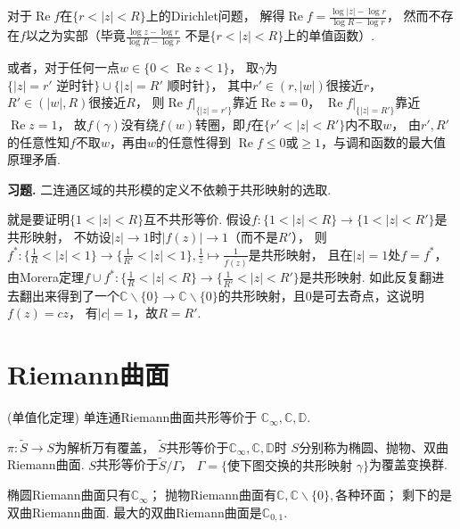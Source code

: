 \begin{proofc}
    对于$\operatorname{Re}f$在$\{r<|z|<R\}$上的Dirichlet问题，
    解得$\operatorname{Re}f=\frac{\log|z|-\log r}{\log R-\log r}$，
    然而不存在$f$以之为实部（毕竟$\frac{\log z-\log r}{\log R-\log r}$
    不是$\{r<|z|<R\}$上的单值函数）.

    或者，对于任何一点$w\in\{0<\operatorname{Re}z<1\}$，
    取$\gamma$为$\{|z|=r'\text{ 逆时针}\}\cup\{|z|=R'\text{ 顺时针}\}$，
    其中$r'\in(r,|w|)$很接近$r$，$R'\in(|w|,R)$很接近$R$，
    则$\operatorname{Re}f|_{\{|z|=r'\}}$靠近$\operatorname{Re}z=0$，
    $\operatorname{Re}f|_{\{|z|=R'\}}$靠近$\operatorname{Re}z=1$，
    故$f(\gamma)$没有绕$f(w)$转圈，即$f$在$\{r'<|z|<R'\}$内不取$w$，
    由$r',R'$的任意性知$f$不取$w$，再由$w$的任意性得到
    $\operatorname{Re}f\leq0$或$\geq1$，与调和函数的最大值原理矛盾.
\end{proofc}

\textbf{习题. } 二连通区域的共形模的定义不依赖于共形映射的选取.

\begin{proofc}
    就是要证明$\{1<|z|<R\}$互不共形等价. 
    假设$f\colon\{1<|z|<R\}\rightarrow\{1<|z|<R'\}$是共形映射，
    不妨设$|z|\rightarrow1$时$|f(z)|\rightarrow1$（而不是$R'$），
    则$f^*\colon\{\frac{1}{R}<|z|<1\}\rightarrow\{\frac{1}{R'}<|z|<1\},
    \frac{1}{\bar{z}}\mapsto\frac{1}{\overline{f(z)}}$是共形映射，
    且在$|z|=1$处$f=f^*$，
    由Morera定理$f\cup f^*\colon\{\frac{1}{R}<|z|<R\}
    \rightarrow\{\frac{1}{R'}<|z|<R'\}$是共形映射.
    如此反复翻进去翻出来得到了一个$\mathbb{C}\backslash\{0\}\rightarrow
    \mathbb{C}\backslash\{0\}$的共形映射，且$0$是可去奇点，这说明$f(z)=cz$，
    有$|c|=1$，故$R=R'$.
\end{proofc}

\section{Riemann曲面}

\begin{proposition}(单值化定理) 单连通Riemann曲面共形等价于
$\mathbb{C}_\infty,\mathbb{C},\mathbb{D}$.\end{proposition}

\begin{definition}$\pi\colon\tilde{S}\rightarrow S$为解析万有覆盖，
$\tilde{S}$共形等价于$\mathbb{C}_\infty,\mathbb{C},\mathbb{D}$时
$S$分别称为椭圆、抛物、双曲Riemann曲面. $S$共形等价于$\tilde{S}/\Gamma$，
$\Gamma=\{\text{使下图交换的共形映射 }\gamma\}$为覆盖变换群.
\end{definition}
\begin{proposition}椭圆Riemann曲面只有$\mathbb{C}_\infty$；
抛物Riemann曲面有$\mathbb{C},\mathbb{C}\backslash\{0\},$各种环面；
剩下的是双曲Riemann曲面.
最大的双曲Riemann曲面是$\mathbb{C}_{0,1}$.\end{proposition}

